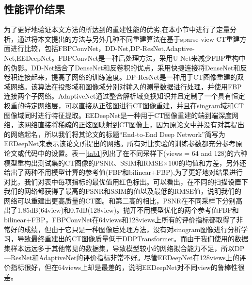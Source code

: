 \subsection{性能评价结果}
为了更好地验证本文方法的所达到的重建性能的优劣,在本小节中进行了定量分析，通过将本文提出的方法与另外几种不同重建算法在基于sparse-view CT重建方面进行比较，包括FBPConvNet\cite{2016FBPConvNet}，DD-Net\cite{2018DDNet},DP-ResNet\cite{2019DP-ResNet},Adaptive-Net\cite{2020ADAPTIVE},EEDeepNet\cite{2020An}。FBPConvNet是一种后处理方法，采用U-Net\cite{2015Unet}来减少FBP重构中的伪影。DD-Net结合了DenseNet\cite{2016DenseNet}和反卷积的优点，采用快捷连接将DenseNet和反卷积连接起来，提高了网络的训练速度。DP-ResNet是一种用于CT图像重建的双域网络。该算法在投影域和图像域分别对输入的测量数据进行处理，并使用FBP连接两个子网络。AdaptiveNet通过整合解析域变换知识并且定制了一个具有恒定权重的特定网络层，可以直接从正弦图进行CT图像重建，并且在singram域和CT图像域同时进行特征提取。EEDeepNet是一种用于CT图像重建的端到端深度网络，该网络直接将稀疏的正炫图映射到CT图像上，因为原论文中并没有对其提出的网络起名，所以我们将其论文的标题“End-to-End Deep Network”简写为EEDeepNet来表示该论文所提出的网络。所有对比实验的训练参数都充分参考原论文或代码中的设置。表一\ref{tab1}列出了在不同采样下(views = 64 and 128)的六种模型重构出测试集的CT图像的PSNR、SSIM和RMSE$\times100$的均值和方差，另外还给出了两种不用模型计算的参考值(FBP和bilinear+FBP),为了更好地对结果进行对比，我们对表中每项指标的最优值用红色标出。可以看出，在不同的扫描设置下我们的网络都获得了最高的PSNR和SSIM的值以及最低的RMSE值，说明我们的网络可以重建出更高质量的CT图。和第二高的相比，PSNR在不同采样下分别高出了1.85dB(64view)和0.7dB(128view)。抛开不用模型优化的两个参考值FBP和bilinear+FBP，FBPConvNet在64views和128views上所有的评价指标都取得了非常好的成绩，但由于它只是一种图像后处理方法，没有对sinogram图像进行分析学习，导致最终重建出的CT图像质量低于DDPTransformer。而由于我们使用的数据集样本远远多于其他常见的数据集，导致模型较小的网络拟合能力不足，所以DP—ResNet和AdaptiveNet的评价指标非常不好。尽管EEDeepNet在128views上的评价指标很好，但在64views上却是最差的，说明EEDeepNet对不同view的鲁棒性很差。\par
